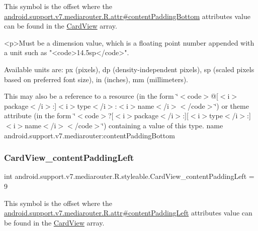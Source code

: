 This symbol is the offset where the \hyperlink{classandroid_1_1support_1_1v7_1_1mediarouter_1_1R_1_1attr_a4e2c931123e93be190daf6768973d35e}{android.\+support.\+v7.\+mediarouter.\+R.\+attr\#content\+Padding\+Bottom} attribute\textquotesingle{}s value can be found in the \hyperlink{classandroid_1_1support_1_1v7_1_1mediarouter_1_1R_1_1styleable_a58720bc744e6374c25e81b8ae15a2c6a}{Card\+View} array.

\begin{DoxyVerb}      <p>Must be a dimension value, which is a floating point number appended with a unit such as "<code>14.5sp</code>".
\end{DoxyVerb}
 Available units are\+: px (pixels), dp (density-\/independent pixels), sp (scaled pixels based on preferred font size), in (inches), mm (millimeters). 

This may also be a reference to a resource (in the form \char`\"{}$<$code$>$@\mbox{[}$<$i$>$package$<$/i$>$\+:\mbox{]}$<$i$>$type$<$/i$>$\+:$<$i$>$name$<$/i$>$$<$/code$>$\char`\"{}) or theme attribute (in the form \char`\"{}$<$code$>$?\mbox{[}$<$i$>$package$<$/i$>$\+:\mbox{]}\mbox{[}$<$i$>$type$<$/i$>$\+:\mbox{]}$<$i$>$name$<$/i$>$$<$/code$>$\char`\"{}) containing a value of this type.  name android.\+support.\+v7.\+mediarouter\+:content\+Padding\+Bottom \mbox{\label{classandroid_1_1support_1_1v7_1_1mediarouter_1_1R_1_1styleable_aa88f6ec6b491928155b54b29bdd4a834}} 
\subsubsection{\texorpdfstring{Card\+View\+\_\+content\+Padding\+Left}{CardView\_contentPaddingLeft}}
{\footnotesize\ttfamily int android.\+support.\+v7.\+mediarouter.\+R.\+styleable.\+Card\+View\+\_\+content\+Padding\+Left = 9\hspace{0.3cm}{\ttfamily [static]}}

This symbol is the offset where the \hyperlink{classandroid_1_1support_1_1v7_1_1mediarouter_1_1R_1_1attr_a5cd1edc7348ee2fafe0dbdec252e01f2}{android.\+support.\+v7.\+mediarouter.\+R.\+attr\#content\+Padding\+Left} attribute\textquotesingle{}s value can be found in the \hyperlink{classandroid_1_1support_1_1v7_1_1mediarouter_1_1R_1_1styleable_a58720bc744e6374c25e81b8ae15a2c6a}{Card\+View} array.

